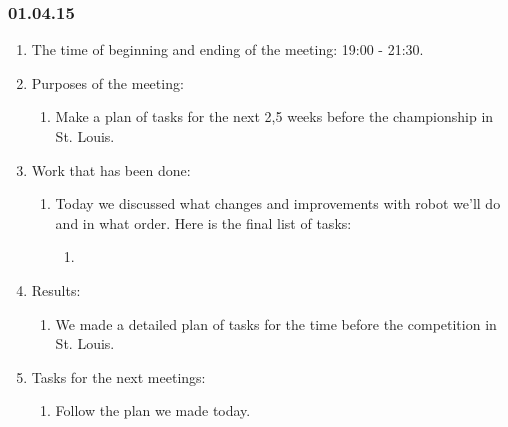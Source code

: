 \subsubsection{01.04.15}
\begin{enumerate}
	
	\item The time of beginning and ending of the meeting: 19:00 - 21:30.
	
	\item Purposes of the meeting: 
	\begin{enumerate}
		
		\item Make a plan of tasks for the next 2,5 weeks before the championship in St. Louis.
		
	\end{enumerate}

	\item Work that has been done:
	\begin{enumerate}
		
		\item Today we discussed what changes and improvements with robot we'll do and in what order. Here is the final list of tasks:
		\begin{enumerate}
			\item
		\end{enumerate}
		
	\end{enumerate}
	
	\item Results:
	\begin{enumerate}
		
		\item We made a detailed plan of tasks for the time before the competition in St. Louis.
		
	\end{enumerate}
	
	\item Tasks for the next meetings:
	\begin{enumerate}
		
		\item Follow the plan we made today.
			
	\end{enumerate}
\end{enumerate}
\fillpage

